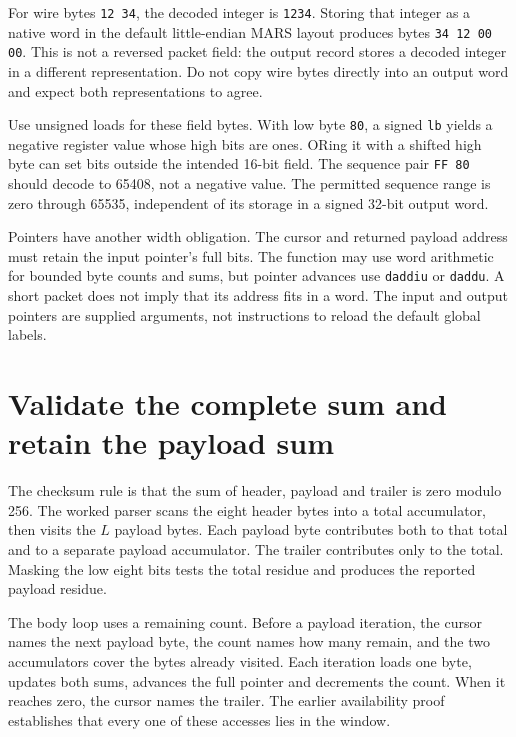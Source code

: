 For wire bytes \texttt{12 34}, the decoded integer is \texttt{1234}. Storing that
integer as a native word in the default little-endian MARS layout produces bytes
\texttt{34 12 00 00}. This is not a reversed packet field: the output record stores
a decoded integer in a different representation. Do not copy wire bytes directly
into an output word and expect both representations to agree.

Use unsigned loads for these field bytes. With low byte \texttt{80}, a signed
\texttt{lb} yields a negative register value whose high bits are ones. ORing it
with a shifted high byte can set bits outside the intended 16-bit field.
The sequence pair \texttt{FF 80} should decode to 65408, not a negative value.
The permitted sequence range is zero through 65535, independent of its storage
in a signed 32-bit output word.

\begin{samepage}
  Pointers have another width obligation. The cursor and returned payload address
  must retain the input pointer's full bits. The function may use word arithmetic
  for bounded byte counts and sums, but pointer advances use \texttt{daddiu} or
  \texttt{daddu}. A short packet does not imply that its address fits in a word.
  The input and output pointers are supplied arguments, not instructions to reload
  the default global labels.\par
\end{samepage}

\section{Validate the complete sum and retain the payload sum}

The checksum rule is that the sum of header, payload and trailer is zero modulo
256. The worked parser scans the eight header bytes into a total accumulator,
then visits the $L$ payload bytes. Each payload byte contributes both to that total
and to a separate payload accumulator. The trailer contributes only to the total.
Masking the low eight bits tests the total residue and produces the reported
payload residue.

The body loop uses a remaining count. Before a payload iteration, the cursor names
the next payload byte, the count names how many remain, and the two accumulators
cover the bytes already visited. Each iteration loads one byte, updates both sums,
advances the full pointer and decrements the count. When it reaches zero, the
cursor names the trailer. The earlier availability proof establishes that every
one of these accesses lies in the window.


